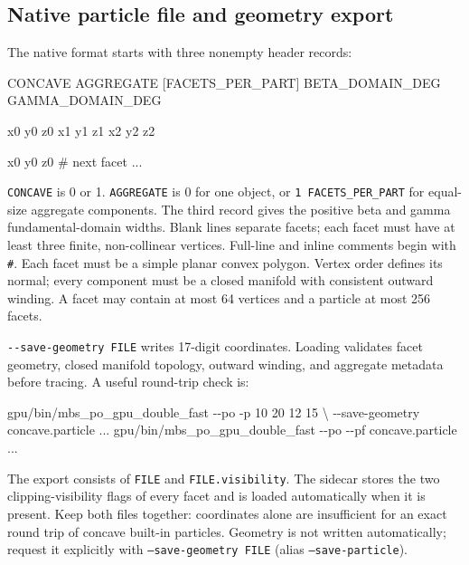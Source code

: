 \documentclass[
  10pt,
  a4paper,
]{article}
\newenvironment{Shaded}{}{}
\newcommand{\AttributeTok}[1]{\textcolor[rgb]{0.49,0.56,0.16}{#1}}
\newcommand{\DataTypeTok}[1]{\textcolor[rgb]{0.56,0.13,0.00}{#1}}
\newcommand{\ExtensionTok}[1]{#1}
\newcommand{\NormalTok}[1]{#1}
\begin{document}
\subsection{Native particle file and geometry export}

The native format starts with three nonempty header records:

\begin{Shaded}
\begin{Highlighting}[]
\NormalTok{CONCAVE}
\NormalTok{AGGREGATE [FACETS_PER_PART]}
\NormalTok{BETA_DOMAIN_DEG GAMMA_DOMAIN_DEG}
\NormalTok{}
\NormalTok{x0 y0 z0}
\NormalTok{x1 y1 z1}
\NormalTok{x2 y2 z2}
\NormalTok{}
\NormalTok{x0 y0 z0      \# next facet}
\NormalTok{...}
\end{Highlighting}
\end{Shaded}

\texttt{CONCAVE} is 0 or 1. \texttt{AGGREGATE} is 0 for one object, or
\texttt{1 FACETS\_PER\_PART} for equal-size aggregate components. The third
record gives the positive beta and gamma fundamental-domain widths. Blank
lines separate facets; each facet must have at least three finite,
non-collinear vertices. Full-line and inline comments begin with
\texttt{\#}. Each facet must be a simple planar convex polygon. Vertex order
defines its normal; every component must be a closed manifold with consistent
outward winding. A facet may contain at most 64 vertices and a particle at most
256 facets.

\texttt{-\/-save-geometry FILE} writes 17-digit coordinates. Loading validates
facet geometry, closed manifold topology, outward winding, and aggregate
metadata before tracing. A useful round-trip check is:

\begin{Shaded}
\begin{Highlighting}[]
\ExtensionTok{gpu/bin/mbs\_po\_gpu\_double\_fast} \AttributeTok{{-}{-}po} \AttributeTok{{-}p}\NormalTok{ 10 20 12 15 }\DataTypeTok{\textbackslash{}}
    \AttributeTok{{-}{-}save-geometry}\NormalTok{ concave.particle ...}
\ExtensionTok{gpu/bin/mbs\_po\_gpu\_double\_fast} \AttributeTok{{-}{-}po} \AttributeTok{{-}{-}pf}\NormalTok{ concave.particle ...}
\end{Highlighting}
\end{Shaded}

The export consists of \texttt{FILE} and \texttt{FILE.visibility}.  The
sidecar stores the two clipping-visibility flags of every facet and is loaded
automatically when it is present.  Keep both files together: coordinates
alone are insufficient for an exact round trip of concave built-in particles.
Geometry is not written automatically; request it explicitly with
\texttt{--save-geometry FILE} (alias \texttt{--save-particle}).
\end{document}
